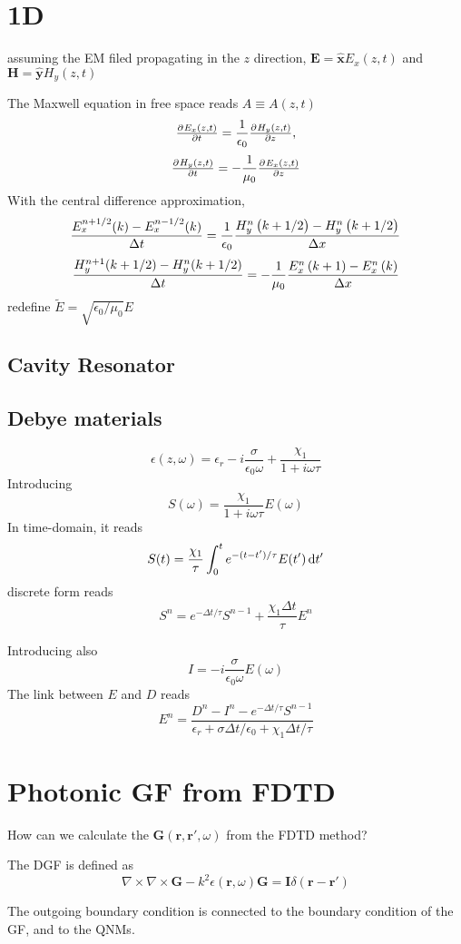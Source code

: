 \documentclass[a4paper,12pt]{book}
\renewcommand{\bf}[1]{\mathbf{#1}}
\newcommand{\grad}{\nabla}
\newcommand{\be}{\begin{equation}}
\newcommand{\ee}{\end{equation}}
\renewcommand{\bf}[1]{\mathbf{#1}}
\renewcommand{\bf}{\mathbf}
\begin{document}
\section{1D}

assuming the EM filed propagating in the $z$ direction, $\bf E = \hat{\bf x} E_x(z,t)$ and $  \bf H = \hat{\bf y} H_y(z,t)$

The Maxwell equation in free space reads $A \equiv A(z,t)$
\be
\pd{E_x(z,t)}{t} =  \frac{1}{\epsilon_0} \pd{H_y(z,t)}{z},
\ee
\be
\pd{H_y(z,t)}{t} =  -\frac{1}{\mu_0} \pd{E_x(z,t)}{z}
\ee
With the central difference approximation,
\be
\frac{E_x^{n + 1/2}(k)-E_x^{n - 1/2}(k)}{\Delta t} = \frac{1}{\epsilon_0} \frac{H_y^n\del{k + 1/2} - H_y^n\del{k + 1/2} }{\Delta x}
\ee
\be
\frac{H_y^{n+1}(k+1/2) - H_y^{n}(k+1/2)}{\Delta t} = -\frac{1}{\mu_0} \frac{E_x^n\del{k + 1} - E_x^n\del{k} }{\Delta x}
\ee
redefine $\tilde{E} = \sqrt{\epsilon_0/\mu_0} E $

\subsection{Cavity Resonator}

\subsection{Debye materials}
\be
\epsilon(z, \omega) = \epsilon_r - i \frac{\sigma}{\epsilon_0 \omega}  + \frac{\chi_1}{1 +i \omega \tau}
\ee
Introducing
\be
S(\omega) = \frac{\chi_1}{1 +i \omega \tau} E(\omega)
\ee
In time-domain, it reads
\be
S(t) = \frac{\chi_1}{\tau} \int_0^t e^{-(t-t')/\tau} E(t')\dif t'
\ee
discrete form reads
\be
S^n = e^{-\Delta t/\tau} S^{{n-1}} + \frac{\chi_1 \Delta t}{\tau}E^n
\ee

Introducing also
\be I = - i \frac{\sigma}{\epsilon_0 \omega} E(\omega)
\ee
The link between $E$ and $D$ reads
\be
E^n = \frac{ D^n - I^n - e^{-\Delta t/\tau}	S^{n-1}}{\epsilon_r + \sigma\Delta t/\epsilon_0+  \chi_1 \Delta t/\tau}
\ee

\section{Photonic GF from FDTD}
How can we calculate the $\bf G(\bf r, \bf r', \omega)$ from the FDTD method?


The DGF is defined as
\be
\grad \times \grad \times \bf G - k^2 \epsilon(\bf r, \omega) \bf G = \bf I \delta(\bf r - \bf r')
\ee

 The outgoing boundary condition is connected to the boundary condition of the GF, and to the QNMs.
\end{document}
